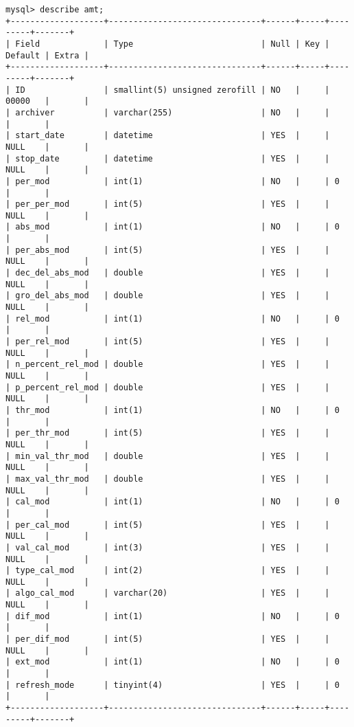\documentclass[11pt,a4paper]{article}
\begin{document}
{\footnotesize
	\begin{Verbatim}
mysql> describe amt;
+-------------------+-------------------------------+------+-----+---------+-------+
| Field             | Type                          | Null | Key | Default | Extra |
+-------------------+-------------------------------+------+-----+---------+-------+
| ID                | smallint(5) unsigned zerofill | NO   |     | 00000   |       |
| archiver          | varchar(255)                  | NO   |     |         |       |
| start_date        | datetime                      | YES  |     | NULL    |       |
| stop_date         | datetime                      | YES  |     | NULL    |       |
| per_mod           | int(1)                        | NO   |     | 0       |       |
| per_per_mod       | int(5)                        | YES  |     | NULL    |       |
| abs_mod           | int(1)                        | NO   |     | 0       |       |
| per_abs_mod       | int(5)                        | YES  |     | NULL    |       |
| dec_del_abs_mod   | double                        | YES  |     | NULL    |       |
| gro_del_abs_mod   | double                        | YES  |     | NULL    |       |
| rel_mod           | int(1)                        | NO   |     | 0       |       |
| per_rel_mod       | int(5)                        | YES  |     | NULL    |       |
| n_percent_rel_mod | double                        | YES  |     | NULL    |       |
| p_percent_rel_mod | double                        | YES  |     | NULL    |       |
| thr_mod           | int(1)                        | NO   |     | 0       |       |
| per_thr_mod       | int(5)                        | YES  |     | NULL    |       |
| min_val_thr_mod   | double                        | YES  |     | NULL    |       |
| max_val_thr_mod   | double                        | YES  |     | NULL    |       |
| cal_mod           | int(1)                        | NO   |     | 0       |       |
| per_cal_mod       | int(5)                        | YES  |     | NULL    |       |
| val_cal_mod       | int(3)                        | YES  |     | NULL    |       |
| type_cal_mod      | int(2)                        | YES  |     | NULL    |       |
| algo_cal_mod      | varchar(20)                   | YES  |     | NULL    |       |
| dif_mod           | int(1)                        | NO   |     | 0       |       |
| per_dif_mod       | int(5)                        | YES  |     | NULL    |       |
| ext_mod           | int(1)                        | NO   |     | 0       |       |
| refresh_mode      | tinyint(4)                    | YES  |     | 0       |       |
+-------------------+-------------------------------+------+-----+---------+-------+
	\end{Verbatim}
}
\end{document}
